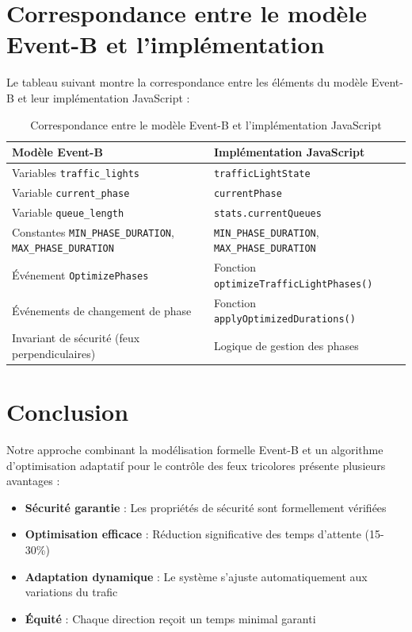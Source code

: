 \documentclass[11pt,a4paper]{article}
\begin{document}
\section{Correspondance entre le modèle Event-B et l'implémentation}
\label{sec:correspondance}

Le tableau suivant montre la correspondance entre les éléments du modèle Event-B et leur implémentation JavaScript :

\begin{table}[h]
    \centering
    \begin{tabular}{|p{6cm}|p{6cm}|}
        \hline
        \textbf{Modèle Event-B} & \textbf{Implémentation JavaScript} \\
        \hline
        Variables \texttt{traffic\_lights} & \texttt{trafficLightState} \\
        \hline
        Variable \texttt{current\_phase} & \texttt{currentPhase} \\
        \hline
        Variable \texttt{queue\_length} & \texttt{stats.currentQueues} \\
        \hline
        Constantes \texttt{MIN\_PHASE\_DURATION}, \texttt{MAX\_PHASE\_DURATION} & \texttt{MIN\_PHASE\_DURATION}, \texttt{MAX\_PHASE\_DURATION} \\
        \hline
        Événement \texttt{OptimizePhases} & Fonction \texttt{optimizeTrafficLightPhases()} \\
        \hline
        Événements de changement de phase & Fonction \texttt{applyOptimizedDurations()} \\
        \hline
        Invariant de sécurité (feux perpendiculaires) & Logique de gestion des phases \\
        \hline
    \end{tabular}
    \caption{Correspondance entre le modèle Event-B et l'implémentation JavaScript}
    \label{tab:correspondance}
\end{table}

\section{Conclusion}
\label{sec:conclusion}

Notre approche combinant la modélisation formelle Event-B et un algorithme d'optimisation adaptatif pour le contrôle des feux tricolores présente plusieurs avantages :

\begin{itemize}
    \item \textbf{Sécurité garantie} : Les propriétés de sécurité sont formellement vérifiées
    \item \textbf{Optimisation efficace} : Réduction significative des temps d'attente (15-30\%)
    \item \textbf{Adaptation dynamique} : Le système s'ajuste automatiquement aux variations du trafic
    \item \textbf{Équité} : Chaque direction reçoit un temps minimal garanti
\end{itemize}
\end{document}
